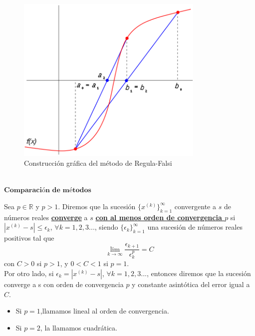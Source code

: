 \begin{figure}
	\begin{center}
		\includegraphics[width=0.8\textwidth]{imagenes/regulaF.png}
	\end{center}
	\caption{Construcción gráfica del método de Regula-Falsi}
	\label{fig:etiq_8}
\end{figure}




${ }$\\
$\textbf{Comparación de métodos}$
${ }$\\


\begin{definicion}
	Sea $p \in \mathbb{R}$ y $p > 1$. Diremos que la sucesión $\{ x^{(k)} \}^{\infty}_{k=1}$ convergente a $s$ de números reales \underline{\textbf{converge}} a $s$ \underline{\textbf{con al menos orden de convergencia $p$}} si $|x^{(k)} -s| \leq \epsilon_k$, $\forall k = 1,2,3...$, siendo $\{ \epsilon_k \}^{\infty}_{k=1}$ una sucesión de números reales positivos tal que
	\[
		\lim_{k \to \infty} \frac{\epsilon_{k+1}}{\epsilon^{p}_{k}} = C
	\]
	con $C > 0$ si $p > 1$, y $0 < C < 1$ si $p = 1$.
	${ }$\\
	
	Por otro lado, si $\epsilon_k = |x^{(k)} -s|$, $\forall k = 1,2,3...$, entonces diremos que la sucesión converge a s con orden de convergencia $p$ y constante asintótica del error igual a $C$.
	\begin{itemize}
		\item Si $p=1$,llamamos lineal al orden de convergencia.
		\item Si $p=2$, la llamamos cuadrática.
	\end{itemize}
\end{definicion}

